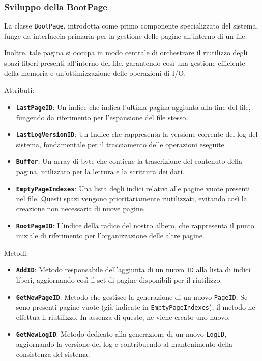 \documentclass[12pt,a4paper,openright,twoside]{book}
\begin{document}
            \subsubsection{Sviluppo della BootPage}

                La classe \texttt{BootPage}, introdotta come primo componente specializzato del sistema, funge da interfaccia primaria per la gestione delle pagine all’interno di un file.

                Inoltre, tale pagina si occupa in modo centrale di orchestrare il riutilizzo degli spazi liberi presenti all’interno del file, garantendo così una gestione efficiente della memoria e un’ottimizzazione delle operazioni di I/O.

                

                Attributi:
                \begin{itemize}
                    \item \textbf{\texttt{LastPageID}}: Un indice che indica l’ultima pagina aggiunta alla fine del file, fungendo da riferimento per l’espansione del file stesso.
                    \item \textbf{\texttt{LastLogVersionID}}: Un Indice che rappresenta la versione corrente del log del sistema, fondamentale per il tracciamento delle operazioni eseguite.
                    \item \textbf{\texttt{Buffer}}: Un array di byte che contiene la trascrizione del contenuto della pagina, utilizzato per la lettura e la scrittura dei dati.
                    \item \textbf{\texttt{EmptyPageIndexes}}: Una lista degli indici relativi alle pagine vuote presenti nel file.
                    Questi spazi vengono prioritariamente riutilizzati, evitando così la creazione non necessaria di nuove pagine.
                    \item \textbf{\texttt{RootPageID}}: L'indice della radice del nostro albero, che rappresenta il punto iniziale di riferimento per l’organizzazione delle altre pagine.
                \end{itemize}

                Metodi:
                \begin{itemize}
                    \item \textbf{\texttt{AddID}}: Metodo responsabile dell’aggiunta di un nuovo \texttt{ID} alla lista di indici liberi, aggiornando così il set di pagine disponibili per il riutilizzo.
                    \item \textbf{\texttt{GetNewPageID}}: Metodo che gestisce la generazione di un nuovo \texttt{PageID}.
                    Se sono presenti pagine vuote (già indicate in \texttt{EmptyPageIndexes}), il metodo ne effettua il riutilizzo.
                    In assenza di queste, ne viene creato uno nuovo.
                    \item \textbf{\texttt{GetNewLogID}}: Metodo dedicato alla generazione di un nuovo \texttt{LogID}, aggiornando la versione del log e contribuendo al mantenimento della consistenza del sistema.
                \end{itemize}
\end{document}
